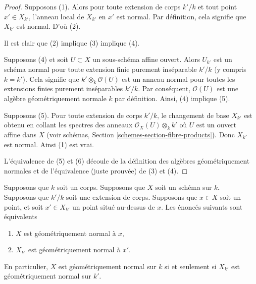 \begin{proof}
Supposons (1). Alors pour toute extension de corps
$k'/k$ et tout point $x' \in X_{k'}$, l'anneau
local de $X_{k'}$ en $x'$ est normal. Par
définition, cela signifie que $X_{k'}$ est normal. D'où (2).

\medskip\noindent
Il est clair que (2) implique (3) implique (4).

\medskip\noindent
Supposons (4) et soit $U \subset X$ un sous-schéma affine
ouvert. Alors $U_{k'}$ est un schéma normal pour toute
extension finie purement inséparable $k'/k$ (y compris $k =
k'$). Cela signifie que $k' \otimes_k \mathcal{O}(U)$ est un
anneau normal pour toutes les extensions finies purement
inséparables $k'/k$. Par conséquent, $\mathcal{O}(U)$ est une algèbre
géométriquement normale $k$ par définition. Ainsi, (4) implique (5).

\medskip\noindent
Supposons (5). Pour toute extension de corps $k'/k$, le
changement de base $X_{k'}$ est obtenu en collant les spectres
des anneaux $\mathcal{O}_X(U) \otimes_k k'$ où $U$ est un
ouvert affine dans $X$ (voir schémas, Section
\ref{schemes-section-fibre-products}). Donc $X_{k'}$ est normal. Ainsi (1) est vrai.

\medskip\noindent
L'équivalence de (5) et (6) découle de la
définition des algèbres géométriquement normales
et de l'équivalence (juste prouvée) de (3) et (4).
\end{proof}

\begin{lemma}
\label{lemma-geometrically-normal-upstairs}
Supposons que $k$ soit un corps. Supposons que $X$
soit un schéma sur $k$. Supposons que $k'/k$ soit
une extension de corps. Supposons que $x \in X$ soit
un point, et soit $x' \in X_{k'}$ un point situé
au-dessus de $x$. Les énoncés suivants sont équivalents
\begin{enumerate}
\item $X$ est géométriquement normal à $x$,
\item $X_{k'}$ est géométriquement normal à $x'$.
\end{enumerate}
En particulier, $X$ est géométriquement normal sur $k$ si et
seulement si $X_{k'}$ est géométriquement normal sur $k'$.
\end{lemma}

